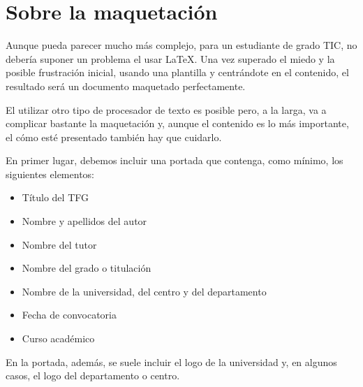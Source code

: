 

\section{Sobre la maquetación}  %



Aunque pueda parecer mucho más complejo, para un estudiante de grado TIC, no debería suponer un problema el usar \LaTeX. Una vez superado el miedo y la posible frustración inicial, usando una plantilla y centrándote en el contenido, el resultado será un documento maquetado perfectamente.

El utilizar otro tipo de procesador de texto es posible pero, a la larga, va a complicar bastante la maquetación y, aunque el contenido es lo más importante, el cómo esté presentado también hay que cuidarlo.

En primer lugar, debemos incluir una portada que contenga, como mínimo, los siguientes elementos:
\begin{itemize}
    \item Título del TFG
    \item Nombre y apellidos del autor
    \item Nombre del tutor
    \item Nombre del grado o titulación
    \item Nombre de la universidad, del centro y del departamento
    \item Fecha de convocatoria
    \item Curso académico
\end{itemize}

En la portada, además, se suele incluir el logo de la universidad y, en algunos casos, el logo del departamento o centro.

